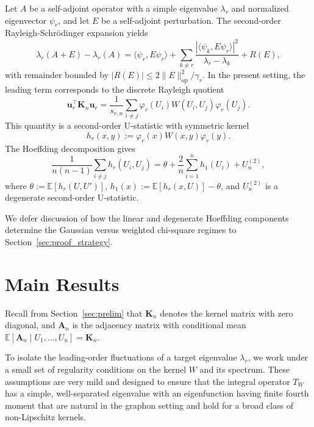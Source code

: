 \documentclass[11pt]{article}
\theoremstyle{plain}
\theoremstyle{remark}
\begin{document}
Let $A$ be a self-adjoint operator with a simple eigenvalue $\lambda_r$ and normalized eigenvector $\psi_r$, and let $E$ be a self-adjoint perturbation. The second-order Rayleigh-Schr\"odinger expansion yields
\[
\lambda_r(A+E)-\lambda_r(A)
=
\langle\psi_r,E\psi_r\rangle
+
\sum_{k\neq r}\frac{|\langle\psi_k,E\psi_r\rangle|^2}{\lambda_r-\lambda_k}
+
R(E),
\]
with remainder bounded by $|R(E)|\le 2\|E\|_{\mathrm{op}}^2/\gamma_r$.
In the present setting, the leading term corresponds to the discrete Rayleigh quotient
\begin{equation}
\mathbf{u}_r^\top\mathbf{K}_n\mathbf{u}_r
=
\frac{1}{s_{r,n}}
\sum_{i\neq j}\varphi_r(U_i)W(U_i,U_j)\varphi_r(U_j).
\label{eq:rayleigh_quotient}
\end{equation}
This quantity is a second-order U-statistic with symmetric kernel
\begin{equation}
h_r(x,y) := \varphi_r(x)W(x,y)\varphi_r(y).
\label{eq:ustat_kernel}
\end{equation}
The Hoeffding decomposition gives
\begin{equation}
\frac{1}{n(n-1)}\sum_{i\neq j}h_r(U_i,U_j)
=
\theta
+
\frac{2}{n}\sum_{i=1}^n h_1(U_i)
+
U_n^{(2)},
\label{eq:hoeffding_decomposition}
\end{equation}
where
\(
\theta := \mathbb{E}[h_r(U,U')]\), \( h_1(x) := \mathbb{E}[h_r(x,U)]-\theta\), and
\(U_n^{(2)}\) is a degenerate second-order U-statistic.



We defer discussion of how the linear and degenerate Hoeffding components determine the Gaussian versus weighted chi-square regimes to Section~\ref{sec:proof_strategy}.


\section{Main Results}
\label{sec:main}

Recall from Section~\ref{sec:prelim} that $\mathbf{K}_n$ denotes the kernel matrix with zero diagonal,
and $\mathbf{A}_n$ is the adjacency matrix with conditional mean $\mathbb{E}[\mathbf{A}_n \mid U_1,\dots,U_n] = \mathbf{K}_n$.

To isolate the leading-order fluctuations of a target eigenvalue $\lambda_r$, we work under a small 
set of regularity conditions on the kernel $W$ and its spectrum. These assumptions are very mild and 
designed to ensure that the integral operator $T_W$ has a simple, well-separated eigenvalue with an eigenfunction having finite fourth moment that are natural in the graphon setting and hold for a broad class 
of non-Lipschitz kernels.
\end{document}
